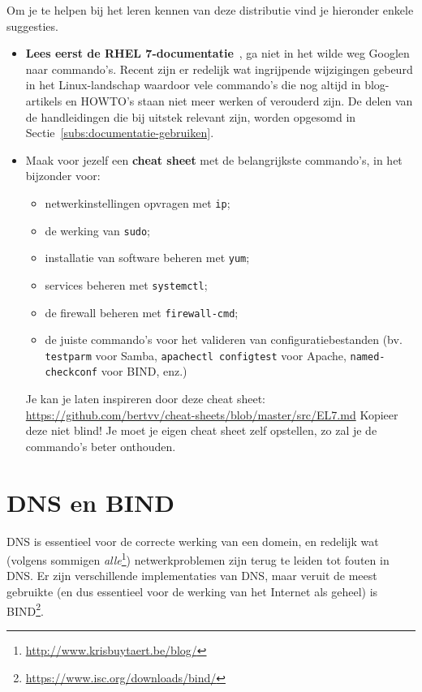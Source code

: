 Om je te helpen bij het leren kennen van deze distributie vind je hieronder enkele suggesties.

\begin{itemize}
  \item \textbf{Lees eerst de RHEL 7-documentatie}~\autocite{SvistunovEtAl2016,JahodaEtAl2016,JahodaEtAl2016a}, ga niet in het wilde weg Googlen naar commando's. Recent zijn er redelijk wat ingrijpende wijzigingen gebeurd in het Linux-landschap waardoor vele commando's die nog altijd in blog-artikels en HOWTO's staan niet meer werken of verouderd zijn. De delen van de handleidingen die bij uitstek relevant zijn, worden opgesomd in Sectie~\ref{subs:documentatie-gebruiken}.
  \item Maak voor jezelf een \textbf{cheat sheet} met de belangrijkste commando's, in het bijzonder voor:
    \begin{itemize}
      \item netwerkinstellingen opvragen met \texttt{ip};
      \item de werking van \texttt{sudo};
      \item installatie van software beheren met \texttt{yum};
      \item services beheren met \texttt{systemctl};
      \item de firewall beheren met \texttt{firewall-cmd};
      \item de juiste commando's voor het valideren van configuratiebestanden (bv. \texttt{testparm} voor Samba, \texttt{apachectl configtest} voor Apache, \texttt{named-checkconf} voor BIND, enz.)
    \end{itemize}

    Je kan je laten inspireren door deze cheat sheet: \url{https://github.com/bertvv/cheat-sheets/blob/master/src/EL7.md} Kopieer deze niet blind! Je moet je eigen cheat sheet zelf opstellen, zo zal je de commando's beter onthouden.
\end{itemize}

\section{DNS en BIND}
\label{sec:dns-en-bind}


DNS is essentieel voor de correcte werking van een domein, en redelijk wat (volgens sommigen \emph{alle}\footnote{\url{http://www.krisbuytaert.be/blog/}}) netwerkproblemen zijn terug te leiden tot fouten in DNS. Er zijn verschillende implementaties van DNS, maar veruit de meest gebruikte (en dus essentieel voor de werking van het Internet als geheel) is BIND\footnote{\url{https://www.isc.org/downloads/bind/}}.


